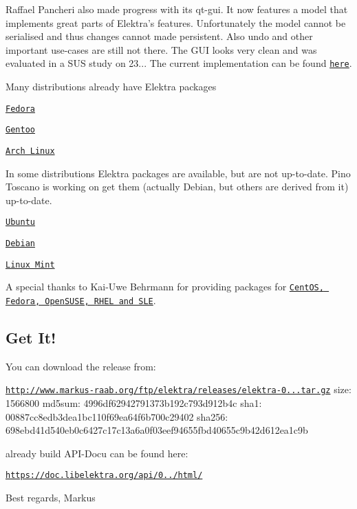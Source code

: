 Raffael Pancheri also made progress with its qt-\/gui. It now features a model that implements great parts of Elektra’s features. Unfortunately the model cannot be serialised and thus changes cannot made persistent. Also undo and other important use-\/cases are still not there. The G\+UI looks very clean and was evaluated in a S\+US study on 23... The current implementation can be found \href{https://github.com/0003088/qt-gui}{\tt here}.

Many distributions already have Elektra packages


\begin{DoxyItemize}
\item \href{https://admin.fedoraproject.org/pkgdb/package/elektra/}{\tt Fedora}
\item \href{http://packages.gentoo.org/package/app-admin/elektra}{\tt Gentoo}
\item \href{https://aur.archlinux.org/packages/elektra/}{\tt Arch Linux}
\end{DoxyItemize}

In some distributions Elektra packages are available, but are not up-\/to-\/date. Pino Toscano is working on get them (actually Debian, but others are derived from it) up-\/to-\/date.


\begin{DoxyItemize}
\item \href{https://launchpad.net/ubuntu/+source/elektra}{\tt Ubuntu}
\item \href{https://packages.debian.org/de/wheezy/libelektra3}{\tt Debian}
\item \href{http://community.linuxmint.com/software/view/elektra}{\tt Linux Mint}
\end{DoxyItemize}

A special thanks to Kai-\/\+Uwe Behrmann for providing packages for \href{http://software.opensuse.org/download.html?project=home%3Abekun&package=elektra}{\tt Cent\+OS, Fedora, Open\+S\+U\+SE, R\+H\+EL and S\+LE}.

\subsection*{Get It!}

You can download the release from\+:

\href{http://www.markus-raab.org/ftp/elektra/releases/elektra-0.8.7.tar.gz}{\tt http\+://www.\+markus-\/raab.\+org/ftp/elektra/releases/elektra-\/0...\+tar.\+gz} size\+: 1566800 md5sum\+: 4996df62942791373b192c793d912b4c sha1\+: 00887cc8edb3dea1bc110f69ea64f6b700c29402 sha256\+: 698ebd41d540eb0c6427c17c13a6a0f03eef94655fbd40655c9b42d612ea1c9b

already build A\+P\+I-\/\+Docu can be found here\+:

\href{https://doc.libelektra.org/api/0.8.7/html/}{\tt https\+://doc.\+libelektra.\+org/api/0../html/}

Best regards, Markus 